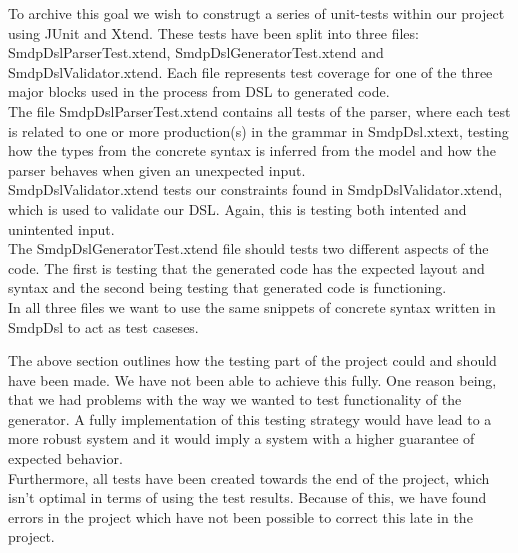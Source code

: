 \documentclass[paper=a4, fontsize=11pt]{scrartcl} %
\numberwithin{equation}{section} %
\numberwithin{figure}{section} %
\numberwithin{table}{section} %
\begin{document}
To archive this goal we wish to construgt a series of unit-tests within our project using JUnit and Xtend. These tests have been split into three files: SmdpDslParserTest.xtend, SmdpDslGeneratorTest.xtend and SmdpDslValidator.xtend. Each file represents test coverage for one of the three major blocks used in the process from DSL to generated code.\\
The file SmdpDslParserTest.xtend contains all tests of the parser, where each test is related to one or more production(s) in the grammar in SmdpDsl.xtext, testing how the types from the concrete syntax is inferred from the model and how the parser behaves when given an unexpected input.\\ 
SmdpDslValidator.xtend tests our constraints found in SmdpDslValidator.xtend, which is used to validate our DSL. Again, this is testing both intented and unintented input.\\ 
The SmdpDslGeneratorTest.xtend file should tests two different aspects of the code. The first is testing that the generated code has the expected layout and syntax and the second being testing that generated code is functioning. \\
In all three files we want to use the same snippets of concrete syntax written in SmdpDsl to act as test caseses.\newline

The above section outlines how the testing part of the project could and should have been made. We have not been able to achieve this fully. One reason being, that we had problems with the way we wanted to test functionality of the generator. A fully implementation of this testing strategy would have lead to a more robust system and it would imply a system with a higher guarantee of expected behavior. \\
Furthermore, all tests have been created towards the end of the project, which isn't optimal in terms of using the test results. Because of this, we have found errors in the project which have not been possible to correct this late in the project.

\end{document}
